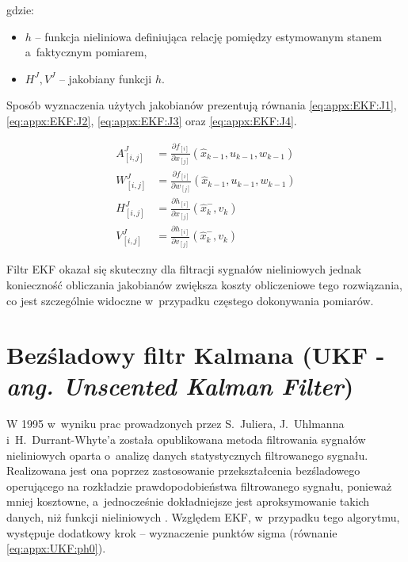 gdzie:
\begin{itemize}
	\item $h$ -- funkcja nieliniowa definiująca relację pomiędzy estymowanym stanem a~faktycznym pomiarem,
	\item $H^J, V^J$ -- jakobiany funkcji $h$.
\end{itemize}
		
Sposób wyznaczenia użytych jakobianów prezentują równania \ref{eq:appx:EKF:J1}, \ref{eq:appx:EKF:J2}, \ref{eq:appx:EKF:J3} oraz \ref{eq:appx:EKF:J4}.
		
\begin{subequations}
	\begin{align}
		A^J_{[i, j]} & = \frac{\partial f_{[i]}}{\partial x_{[j]}}(\widehat{x}_{k-1}, u_{k-1}, w_{k-1}) \label{eq:appx:EKF:J1} \\
		W^J_{[i, j]} & = \frac{\partial f_{[i]}}{\partial w_{[j]}}(\widehat{x}_{k-1}, u_{k-1}, w_{k-1}) \label{eq:appx:EKF:J2} \\
		H^J_{[i, j]} & = \frac{\partial h_{[i]}}{\partial x_{[j]}}(\widehat{x}^-_k, v_k) \label{eq:appx:EKF:J3}                \\
		V^J_{[i, j]} & = \frac{\partial h_{[i]}}{\partial v_{[j]}}(\widehat{x}^-_k, v_k) \label{eq:appx:EKF:J4}                
	\end{align}
\end{subequations}
		
Filtr EKF okazał się skuteczny dla filtracji sygnałów nieliniowych jednak konieczność obliczania jakobianów zwiększa koszty obliczeniowe tego rozwiązania, co jest szczególnie widoczne w~przypadku częstego dokonywania pomiarów. 
		
		
\section*{Bezśladowy filtr Kalmana (UKF - \emph{ang. Unscented Kalman Filter})}
\label{sec:appx:filters:UKF}
W 1995 w~wyniku prac prowadzonych przez S.~Juliera, J.~Uhlmanna i~H.~Durrant-Whyte'a została opublikowana \cite{Julier1995} metoda filtrowania sygnałów nieliniowych oparta o~analizę danych statystycznych filtrowanego sygnału. Realizowana jest ona poprzez zastosowanie przekształcenia bezśladowego operującego na rozkładzie prawdopodobieństwa filtrowanego sygnału, ponieważ mniej kosztowne, a~jednocześnie dokładniejsze jest aproksymowanie takich danych, niż funkcji nieliniowych \cite{Uhlmann94}.
Względem EKF, w~przypadku tego algorytmu, występuje dodatkowy krok -- wyznaczenie punktów sigma (równanie \ref{eq:appx:UKF:ph0}). 
		
